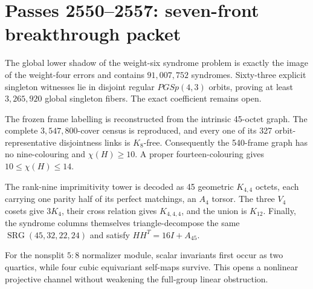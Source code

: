 \section*{Passes 2550--2557: seven-front breakthrough packet}
The global lower shadow of the weight-six syndrome problem is exactly the image of the weight-four errors and contains $91{,}007{,}752$ syndromes.  Sixty-three explicit singleton witnesses lie in disjoint regular $PGSp(4,3)$ orbits, proving at least $3{,}265{,}920$ global singleton fibers.  The exact coefficient remains open.

The frozen frame labelling is reconstructed from the intrinsic 45-octet graph.  The complete $3{,}547{,}800$-cover census is reproduced, and every one of its 327 orbit-representative disjointness links is $K_8$-free.  Consequently the 540-frame graph has no nine-colouring and $\chi(H)\ge10$.  A proper fourteen-colouring gives $10\le\chi(H)\le14$.

The rank-nine imprimitivity tower is decoded as 45 geometric $K_{4,4}$ octets, each carrying one parity half of its perfect matchings, an $A_4$ torsor.  The three $V_4$ cosets give $3K_4$, their cross relation gives $K_{4,4,4}$, and the union is $K_{12}$.  Finally, the syndrome columns themselves triangle-decompose the same $\operatorname{SRG}(45,32,22,24)$ and satisfy $HH^T=16I+A_{45}$.

For the nonsplit $5{:}8$ normalizer module, scalar invariants first occur as two quartics, while four cubic equivariant self-maps survive.  This opens a nonlinear projective channel without weakening the full-group linear obstruction.
